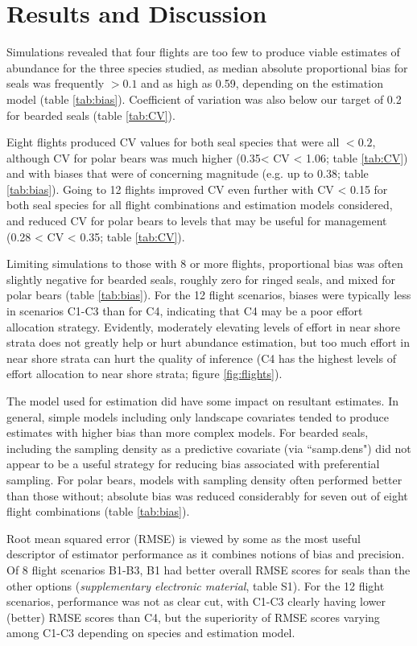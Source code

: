 \documentclass[]{rsos}%
\begin{document}
{\section{Results and Discussion}

Simulations revealed that four flights are too few to produce viable estimates of abundance for the three species studied, as median absolute proportional bias for seals was frequently $>0.1$ and as high as 0.59, depending on the estimation model (table \ref{tab:bias}). Coefficient of variation was also below our target of 0.2 for bearded seals (table \ref{tab:CV}).

Eight flights produced CV values for both seal species that were all $<0.2$, although CV for polar bears was much higher (0.35< CV < 1.06; table \ref{tab:CV}) and with biases that were of concerning magnitude (e.g. up to 0.38; table \ref{tab:bias}).  Going to 12 flights improved CV even further with CV < 0.15 for both seal species for all flight combinations and estimation models considered, and reduced CV for polar bears to levels that may be useful for management (0.28 < CV < 0.35; table \ref{tab:CV}).

Limiting simulations to those with 8 or more flights, proportional bias was often slightly negative for bearded seals, roughly zero for ringed seals, and mixed for polar bears (table \ref{tab:bias}).  For the 12 flight scenarios, biases were typically less in scenarios C1-C3 than for C4, indicating that C4 may be a poor effort allocation strategy.  Evidently, moderately elevating levels of effort in near shore strata does not greatly help or hurt abundance estimation, but too much effort in near shore strata can hurt the quality of inference (C4 has the highest levels of effort allocation to near shore strata; figure \ref{fig:flights}).

The model used for estimation did have some impact on resultant estimates.  In general, simple models including only landscape covariates tended to produce estimates with higher bias than more complex models.  For bearded seals, including the sampling density as a predictive covariate (via ``samp.dens") did not appear to be a useful strategy for reducing bias associated with preferential sampling. For polar bears, models with sampling density often performed better than those without; absolute bias was reduced considerably for seven out of eight flight combinations (table \ref{tab:bias}).

Root mean squared error (RMSE) is viewed by some as the most useful descriptor of estimator performance as it combines notions of bias and precision.  Of 8 flight scenarios B1-B3, B1 had better overall RMSE scores for seals than the other options (\textit{supplementary electronic material}, table S1).  For the 12 flight scenarios, performance was not as clear cut, with C1-C3 clearly having lower (better) RMSE scores than C4, but the superiority of RMSE scores varying among C1-C3 depending on species and estimation model.

}
\end{document}
